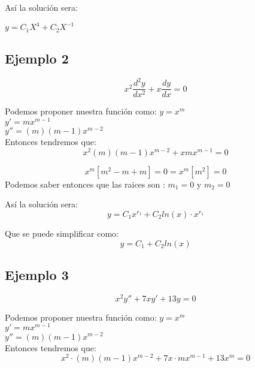 \documentclass[12pt]{article}							    %
\begin{document}
		Así la solución sera:

		$y = C_1X^4 + C_2 X^{-1}$

		\subsection{Ejemplo 2}
		\begin{equation*}
			x^2 \frac{d^2 y}{dx^2} + x \frac{dy}{dx} = 0
		\end{equation*}

		Podemos proponer nuestra función como:
		$y = x^m$\\
		$y' = mx^{m-1}$\\
		$y'' = (m)(m-1)x^{m-2}$\\

		Entonces tendremos que:
		\begin{equation*}
			x^2 (m)(m-1)x^{m-2} + x mx^{m-1} = 0
		\end{equation*}

		\begin{equation*}
			x^m [m^2 - m + m] = 0 = x^m [m^2] = 0
		\end{equation*}
		Podemos saber entonces que las raices son : $ m_1 = 0$ y $m_2 = 0$

		Así la solución sera:
		\begin{equation*}
			y = C_1 x ^{r_1} + C_2 ln(x) \cdot x^{r_1}
		\end{equation*}

		Que se puede simplificar como:
		\begin{equation*}
			y = C_1 + C_2 ln(x)
		\end{equation*}



		\subsection{Ejemplo 3}
		\begin{equation*}
			x^2 y'' + 7 x y' + 13y = 0
		\end{equation*}

		Podemos proponer nuestra función como:
		$y = x^m$\\
		$y' = mx^{m-1}$\\
		$y'' = (m)(m-1)x^{m-2}$\\

		Entonces tendremos que:
		\begin{equation*}
			x^2 \cdot (m)(m-1)x^{m-2} + 7x \cdot mx^{m-1} + 13 x^m= 0
		\end{equation*}
\end{document}
